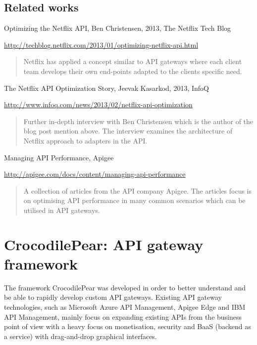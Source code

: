 \documentclass{cslthse-msc}
\begin{document}
\section{Related works}
Optimizing the Netflix API, Ben Christensen, 2013, The Netflix Tech Blog

\noindent \url{http://techblog.netflix.com/2013/01/optimizing-netflix-api.html}

\begin{quote}
	Netflix has applied a concept similar to API gateways where each client team develops their own end-points adapted to the clients specific need.
\end{quote}

\vspace{5mm}

\noindent The Netflix API Optimization Story, Jeevak Kasarkod, 2013, InfoQ

\noindent \url{http://www.infoq.com/news/2013/02/netflix-api-optimization}

\begin{quote}
	Further in-depth interview with Ben Christensen which is the author of the blog post mention above. The interview examines the architecture of Netflix approach to adapters in the API.
\end{quote}

\vspace{5mm}

\noindent Managing API Performance, Apigee

\noindent \url{http://apigee.com/docs/content/managing-api-performance}

\begin{quote}
	A collection of articles from the API company Apigee. The articles focus is on optimising API performance in many common scenarios which can be utilised in API gateways.
\end{quote}

\chapter{CrocodilePear: API gateway framework}

The framework CrocodilePear was developed in order to better understand and be able to rapidly develop custom API gateways. Existing API gateway technologies, such as Microsoft Azure API Management\cite{azure_api_management}, Apigee Edge\cite{apigee_edge} and IBM API Management\cite{ibm_api_management}, mainly focus on expanding existing APIs from the business point of view with a heavy focus on monetisation, security and BaaS (backend as a service) with drag-and-drop graphical interfaces. 
\end{document}
